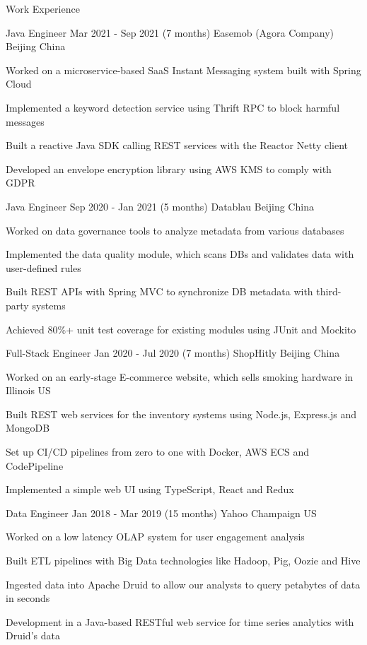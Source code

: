 \documentclass{resume} %
\begin{document}
\begin{rSection}{Work Experience}

\begin{rSubsection}
{Java Engineer} {Mar 2021 - Sep 2021 (7 months)} {Easemob (Agora Company)} {Beijing China}
\item Worked on a microservice-based SaaS Instant Messaging system built with Spring Cloud
\item Implemented a keyword detection service using Thrift RPC to block harmful messages
\item Built a reactive Java SDK calling REST services with the Reactor Netty client
\item Developed an envelope encryption library using AWS KMS to comply with GDPR
\end{rSubsection}

\begin{rSubsection}
{Java Engineer} {Sep 2020 - Jan 2021 (5 months)} {Datablau} {Beijing China}
\item Worked on data governance tools to analyze metadata from various databases
\item Implemented the data quality module, which scans DBs and validates data with user-defined rules
\item Built REST APIs with Spring MVC to synchronize DB metadata with third-party systems
\item Achieved 80\%+ unit test coverage for existing modules using JUnit and Mockito
\end{rSubsection}

\begin{rSubsection}
{Full-Stack Engineer} {Jan 2020 - Jul 2020 (7 months)} {ShopHitly} {Beijing China}
\item Worked on an early-stage E-commerce website, which sells smoking hardware in Illinois US
\item Built REST web services for the inventory systems using Node.js, Express.js and MongoDB
\item Set up CI/CD pipelines from zero to one with Docker, AWS ECS and CodePipeline
\item Implemented a simple web UI using TypeScript, React and Redux
\end{rSubsection}

\begin{rSubsection}
{Data Engineer} {Jan 2018 - Mar 2019 (15 months)} {Yahoo} {Champaign US}
\item Worked on a low latency OLAP system for user engagement analysis
\item Built ETL pipelines with Big Data technologies like Hadoop, Pig, Oozie and Hive
\item Ingested data into Apache Druid to allow our analysts to query petabytes of data in seconds
\item Development in a Java-based RESTful web service for time series analytics with Druid's data
\end{rSubsection}


\end{rSection}
\end{document}
